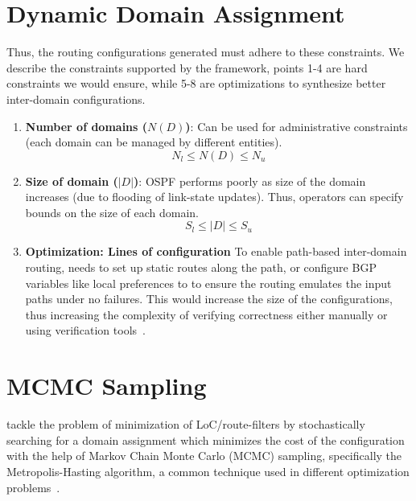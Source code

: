 \section{Dynamic Domain Assignment}
Thus, the routing 
configurations generated must adhere to 
these constraints. We describe the constraints
supported by the framework, points 1-4 are 
hard constraints we would ensure, while 5-8
are optimizations to synthesize better inter-domain
configurations. 

\begin{enumerate}
	\item \textbf{Number of domains ($N(D)$)}: 
	Can be used for administrative constraints 
	(each domain can be managed by different
	entities). 
	\begin{equation}
	N_l \leq N(D) \leq N_u
	\end{equation}

	\item \textbf{Size of domain ($|D|$)}: OSPF
	performs poorly as size of the domain increases
	(due to flooding of link-state updates). Thus,
	operators can specify bounds on the size of each
	domain.
	\begin{equation}
	S_l \leq |D| \leq S_u
	\end{equation}


	\item \textbf{Optimization: Lines of configuration} 
	To enable path-based inter-domain routing, \name needs
	to set up static routes along the path, or configure BGP 
	variables like local preferences to 
	to ensure the routing emulates the input paths under no 
	failures. This would increase the size of the configurations,
	thus increasing the complexity of verifying correctness either 
	manually or using verification tools~\cite{batfish}. 

\end{enumerate}

\section{MCMC Sampling}
\name tackle the problem of minimization of LoC/route-filters
by stochastically searching for a domain assignment which 
minimizes the cost of the configuration with the help of Markov
Chain Monte Carlo (MCMC) sampling, specifically the Metropolis-Hasting
algorithm, a common technique used in different optimization 
problems~\cite{stoke}. 

